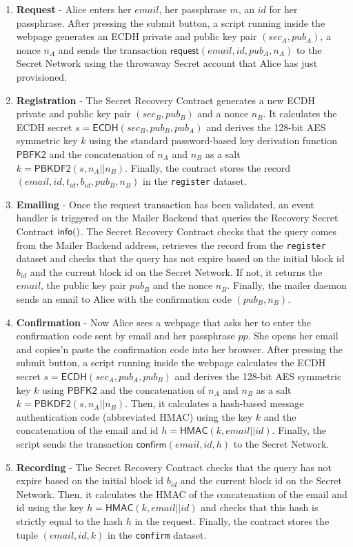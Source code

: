 \documentclass[12pt]{article}
\newcommand{\ms}[1]{\ensuremath{\mathsf{#1}}}
\newcommand{\tx}[3]{\ms{#1}(#3)}
\newcommand{\qry}[3]{\ms{#1}(#3)}
\begin{document}
\begin{enumerate} 
\item {\bf Request} - Alice enters her $email$, her passphrase $m$, an $id$ for her passphrase. After pressing the submit button, a script running inside the webpage generates an ECDH private and public key pair $(sec_A, pub_A)$, a nonce $n_A$ and sends the transaction $\tx{request}{t_{id}, b_{id}}{email, id, pub_A, n_A}$ to the Secret Network using the throwaway Secret account that Alice has just provisioned. 
\item {\bf Registration} - The Secret Recovery Contract generates a new ECDH private and public key pair $(sec_B, pub_B)$ and a nonce $n_B$. It calculates the ECDH secret $s=\ms{ECDH}(sec_B, pub_B, pub_A)$ and derives the 128-bit AES symmetric key $k$ using the standard password-based key derivation function $\ms{PBFK2}$ and the concatenation of $n_A$ and $n_B$ as a salt $k=\ms{PBKDF2}(s, n_A || n_B)$. Finally, the contract stores the record $(email, id, t_{id}, b_{id}, pub_B, n_B)$ in the {\tt register} dataset.
\item {\bf Emailing} - Once the request transaction has been validated, an event handler is triggered on the Mailer Backend that queries the Recovery Secret Contract $\qry{info}{t_id}$. The Secret Recovery Contract checks that the query comes from the Mailer Backend address, retrieves the record from the {\tt register} dataset and checks that the query has not expire based on the initial block id $b_{id}$ and the current block id on the Secret Network. If not, it returns the $email$, the public key pair $pub_B$ and the nonce $n_B$. Finally, the mailer daemon sends an email to Alice with the confirmation code $(pub_B, n_B)$. 
\item {\bf Confirmation} - Now Alice sees a webpage that asks her to enter the confirmation code sent by email and her passphrase $pp$. She opens her email and copies'n paste the confirmation code into her browser. After pressing the submit button, a script running inside the webpage calculates the ECDH secret $s=\ms{ECDH}(sec_A, pub_A, pub_B)$ and derives the 128-bit AES symmetric key $k$ using $\ms{PBFK2}$ and the concatenation of $n_A$ and $n_B$ as a salt $k=\ms{PBKDF2}(s, n_A || n_B)$. Then, it calculates a hash-based message authentication code (abbreviated HMAC) using the key $k$ and the concatenation of the email and id $h=\ms{HMAC}(k, email || id)$. Finally, the script sends the transaction $\tx{confirm}{t_{id}', b_{id}'}{email, id, h}$ to the Secret Network. 
\item {\bf Recording} - The Secret Recovery Contract checks that the query has not expire based on the initial block id $b_{id}$ and the current block id on the Secret Network. Then, it calculates the HMAC of the concatenation of the email and id using the key $h=\ms{HMAC}(k, email || id)$ and checks that this hash is strictly equal to the hash $h$ in the request. Finally, the contract stores the tuple $(email, id, k)$ in the {\tt confirm} dataset.

\end{enumerate}
\end{document}
